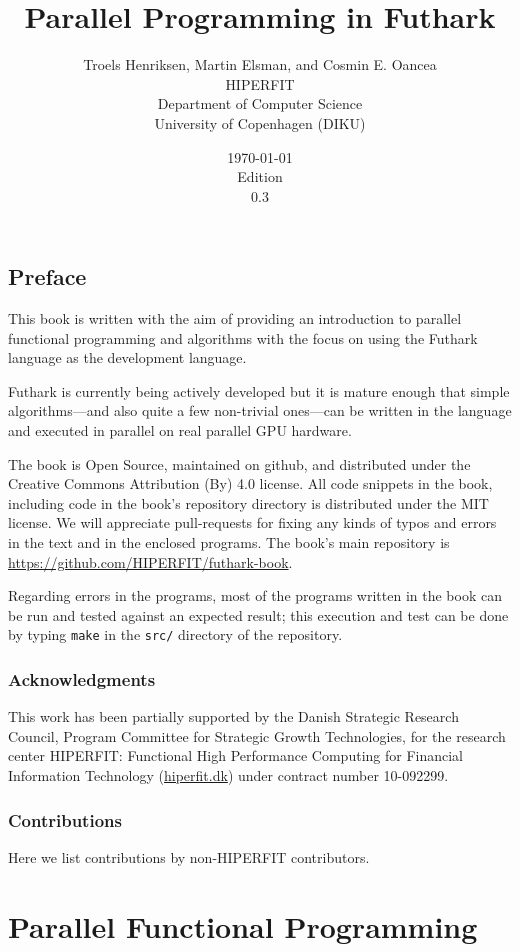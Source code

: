 \documentclass[oneside,11pt]{book}
\title{\bf Parallel Programming in Futhark}
\author{Troels Henriksen, Martin Elsman, and Cosmin E. Oancea \\[2mm] HIPERFIT \\[2mm] Department of Computer Science \\ University of Copenhagen (DIKU)}
\date{\today \\[5mm] Edition \\ 0.3}
\begin{document}
\frontmatter
\maketitle
\chapter{Preface}

This book is written with the aim of providing an introduction to
parallel functional programming and algorithms with the focus on using
the Futhark language as the development language.

Futhark is currently being actively developed but it is mature enough
that simple algorithms---and also quite a few non-trivial ones---can
be written in the language and executed in parallel on real parallel
GPU hardware.

The book is Open Source, maintained on github, and distributed under
the Creative Commons Attribution (By) 4.0 license. All code snippets
in the book, including code in the book's repository directory is
distributed under the MIT license. We will appreciate pull-requests
for fixing any kinds of typos and errors in the text and in the
enclosed programs. The book's main repository is \url{https://github.com/HIPERFIT/futhark-book}.

Regarding errors in the programs, most of the
programs written in the book can be run and tested against an expected
result; this execution and test can be done by typing \texttt{make} in
the \texttt{src/} directory of the repository.

\section*{Acknowledgments}
This work has been partially supported by the Danish Strategic Research
Council, Program Committee for Strategic Growth Technologies, for the
research center HIPERFIT: Functional High Performance Computing for
Financial Information Technology (\url{hiperfit.dk}) under contract number
10-092299.

\section*{Contributions}
Here we list contributions by non-HIPERFIT contributors.


\tableofcontents
\mainmatter
\part{Parallel Functional Programming}
\end{document}
